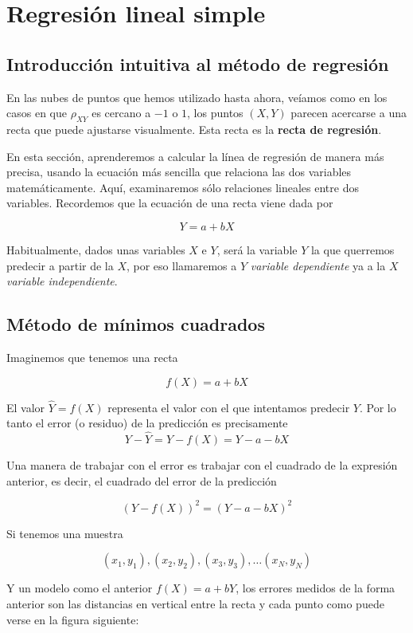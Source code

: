 \documentclass[]{book}
\theoremstyle{plain}
\theoremstyle{definition}
\begin{document}
\section{Regresión lineal simple}

\subsection*{Introducción intuitiva al método de regresión}
En las nubes de puntos que hemos utilizado hasta ahora, veíamos como en
los casos en que \(\rho_{XY}\) es cercano a \(-1\) o \(1\), los puntos
\((X,Y)\) parecen acercarse a una recta que puede ajustarse visualmente.
Esta recta es la \textbf{recta de regresión}.

En esta sección, aprenderemos a calcular la línea de regresión de manera
más precisa, usando la ecuación más sencilla que relaciona las dos
variables matemáticamente. Aquí, examinaremos sólo relaciones lineales
entre dos variables. Recordemos que la ecuación de una recta viene dada
por

\[Y= a + b X \]

Habitualmente, dados unas variables \(X\) e \(Y\), será la variable
\(Y\) la que querremos predecir a partir de la \(X\), por eso llamaremos
a \(Y\) \emph{variable dependiente} ya a la \(X\) \emph{variable
independiente}.

\hypertarget{muxe9todo-de-muxednimos-cuadrados}{%
\subsection{Método de mínimos
cuadrados}\label{muxe9todo-de-muxednimos-cuadrados}}

Imaginemos que tenemos una recta

\[f(X)= a + b X\]

El valor \(\hat Y = f(X)\) representa el valor con el que intentamos
predecir \(Y\). Por lo tanto el error (o residuo) de la predicción es
precisamente \[Y- \hat Y = Y - f(X) = Y- a - b X\]

Una manera de trabajar con el error es trabajar con el cuadrado de la
expresión anterior, es decir, el cuadrado del error de la predicción

\[(Y- f(X))^2 = (Y- a - bX)^2\]

Si tenemos una muestra

\[(x_1, y_1), (x_2, y_2), (x_3,y_3), \ldots (x_N,y_N)\]

Y un modelo como el anterior \(f(X) = a + bY\), los errores medidos de
la forma anterior son las distancias en vertical entre la recta y cada
punto como puede verse en la figura siguiente:
\end{document}

